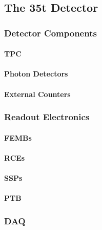 \subsection{The 35t Detector}\label{sec:35tDetector}

\subsubsection{Detector Components}\label{sec:35tDetectorComponents}

\paragraph{TPC}\label{35tTPC}

\paragraph{Photon Detectors}\label{35tPhoton}

\paragraph{External Counters}\label{35tCounters}

\subsubsection{Readout Electronics}\label{sec:35tReadoutElectronics}

\paragraph{FEMBs}\label{35tFEMB}

\paragraph{RCEs}\label{35tRCE}

\paragraph{SSPs}\label{35tSSP}

\paragraph{PTB}\label{35tPTB}

\subsubsection{DAQ}\label{35tDAQ}

